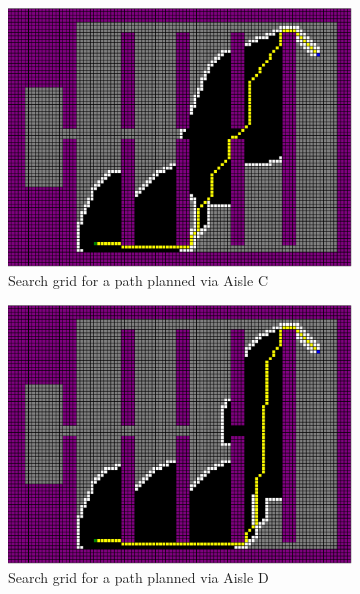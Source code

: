 \documentclass[a4paper,12pt]{article}
\begin{document}
\begin{figure}[htp]
\begin{subfigure}{.45\textwidth}
					\centering
					\includegraphics[width=\textwidth]{../exports/initial_search_grid_aisleC}
					\caption{Search grid for a path planned via Aisle C}
					\label{fig:searchGridAisleC}
				\end{subfigure}
				\begin{subfigure}{.45\textwidth}
					\centering
					\includegraphics[width=\textwidth]{../exports/initial_search_grid_aisleD}
					\caption{Search grid for a path planned via Aisle D}
					\label{fig:searchGridAisleD}
				\end{subfigure}
				\begin{subfigure}{.45\textwidth}
					\centering

\end{subfigure}
\end{figure}
\end{document}

